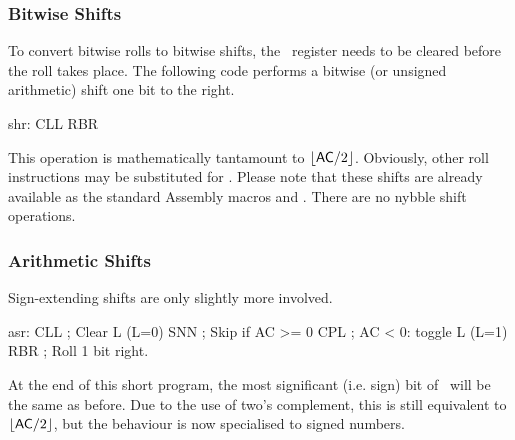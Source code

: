 %
%
%

\subsubsection{Bitwise Shifts}

To convert bitwise rolls to bitwise shifts, the \Lreg\ register needs
to be cleared before the roll takes place. The following code performs
a bitwise (or unsigned arithmetic) shift one bit to the right.

\begin{cftasmcode}
shr:    CLL RBR
\end{cftasmcode}

This operation is mathematically tantamount to
$\lfloor\mbox{\A}/2\rfloor$. Obviously, other roll instructions may be
substituted for . Please note that these shifts are already available
as the standard Assembly macros  and . There are no nybble
shift operations.

\subsubsection{Arithmetic Shifts}

Sign-extending shifts are only slightly more involved.

\begin{cftasmcode}
asr:    CLL       ; Clear L (L=0)
        SNN       ; Skip if AC >= 0
        CPL       ;   AC < 0: toggle L (L=1)
        RBR       ;   Roll 1 bit right.
\end{cftasmcode}

At the end of this short program, the most significant (i.e. sign) bit
of \A\ will be the same as before. Due to the use of two's complement,
this is still equivalent to $\lfloor\mbox{\A}/2\rfloor$, but the
behaviour is now specialised to signed numbers.

